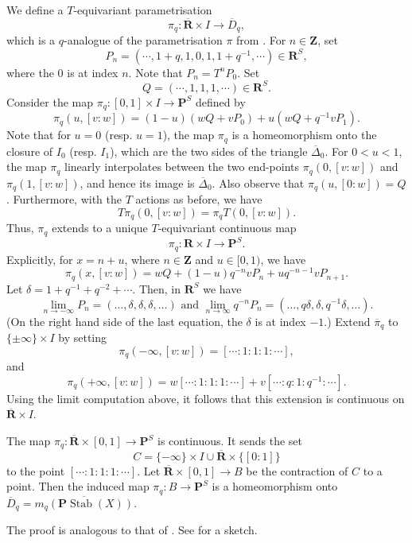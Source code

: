 \documentclass{amsart}
\begin{document}
We define a \(T\)-equivariant parametrisation
\[ \pi_q \colon \overline{\mathbf{R}} \times I \to \overline D_q,\]
which is a \(q\)-analogue of the parametrisation \(\pi\) from .
For \(n \in \mathbf{Z}\), set
\[ P_n = (\cdots , 1+q , 1,  0 , 1 , 1+q^{-1} , \cdots) \in \mathbf{R}^S,\]
where the \(0\) is at index \(n\).
Note that \(P_n = T^nP_0\).
Set
\[ Q = (\cdots , 1, 1, 1, \cdots ) \in \mathbf{R}^S.\]
Consider the map \(\pi_{q} \colon [0,1] \times I \to \mathbf{P}^S\) defined by
\[ \pi_q(u,[v:w]) = (1-u)(wQ + vP_0) + u (wQ + q^{-1}vP_1).\]
Note that for \(u = 0\) (resp. \(u = 1\)), the map \(\pi_q\) is a homeomorphism onto the closure of \(I_0\) (resp. \(I_1\)), which are the two sides of the triangle \(\overline{\Delta}_0\).
For \(0 < u < 1\), the map \(\pi_q\) linearly interpolates between the two end-points \(\pi_q(0,[v:w])\) and \(\pi_q(1,[v:w])\), and hence its image is \(\overline \Delta_0\).
Also observe that \(\pi_q(u,[0:w]) = Q\).
Furthermore, with the \(T\) actions as before, we have
\[ T \pi_q(0,[v:w]) = \pi_q T(0,[v:w]).\]
Thus, \(\pi_q\) extends to a unique \(T\)-equivariant continuous map
\[ \pi_q \colon \mathbf{R} \times I \to \mathbf{P}^S.\]
Explicitly, for \(x = n + u\), where \(n \in \mathbf{Z}\) and \(u \in [0,1)\), we have
\[ \pi_q(x,[v:w]) = w Q + (1-u) q^{-n}v P_n + u q^{-n-1}vP_{n+1}.\]
Let \(\delta = 1 + q^{-1} + q^{-2} + \cdots\).
Then, in \(\mathbf{R}^S\) we have
\[ \lim_{n \to -\infty} P_n = (\dots, \delta, \delta, \delta, \dots) \text{ and } \lim_{n \to \infty}q^{-n}P_n = (\dots, q \delta,\delta ,q^{-1} \delta,\dots).\]
(On the right hand side of the last equation, the \(\delta\) is at index \(-1\).)
Extend \(\overline \pi_q\) to \(\{\pm \infty\} \times I\) by setting
\[ \pi_q(-\infty, [v:w]) = [\cdots : 1 : 1 : 1 : \cdots],\]
and
\[ \pi_q(+\infty, [v:w]) = w [\cdots : 1 : 1 : 1 : \cdots] + v [\cdots : q : 1 : q^{-1} : \cdots].\]
Using the limit computation above, it follows that this extension is continuous on \(\overline{\mathbf{R}} \times I\).
\begin{theorem}\label{prop:q-pi}
  The map \(\pi_{q} \colon \overline{\mathbf{R}} \times [0,1] \to \mathbf{P}^S\) is continuous.
  It sends the set \[C = \{- \infty\} \times I \cup \overline{\mathbf{R}} \times \{[0:1]\}\]
  to the point \([\cdots: 1: 1: 1: \cdots]\).
  Let \(\overline{\mathbf{R}} \times [0,1] \to B\) be the contraction of \(C\) to a point.
  Then the induced map \(\pi_{q} \colon B \to \mathbf{P}^S\) is a homeomorphism onto \(\overline D_q = \overline{m_{q}(\mathbf{P}\operatorname{Stab}(X))}\).
\end{theorem}
The proof is analogous to that of .
See  for a sketch.
\end{document}
